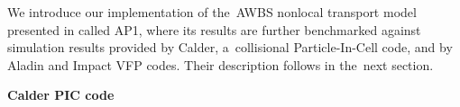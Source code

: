 We introduce our implementation of the~AWBS nonlocal transport model presented
in  called AP1,
where its results are further benchmarked against simulation results
provided by Calder, a~collisional Particle-In-Cell
code, and by Aladin and Impact VFP codes. 
Their description follows in the~next section.



\textbf{Calder PIC code}

